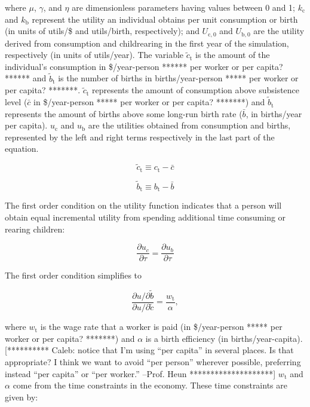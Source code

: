 \documentclass[letterpaper,12pt]{article}
\begin{document}
\noindent where $\mu$, $\gamma$, and $\eta$ are dimensionless parameters having values between 0 and 1; $k_\mathrm{c}$ and $k_\mathrm{b}$ represent the utility an individual obtains per unit consumption or birth (in units of utils/\$ and utils/birth, respectively); and $U_{\mathrm{c,0}}$ and $U_{\mathrm{b,0}}$ are the utility derived from consumption and childrearing in the first year of the simulation, respectively (in units of utils/year). The variable $\tilde c_\mathrm{t}$ is the amount of the individual's consumption in \$/year-person ****** per worker or per capita? ****** and $\tilde b_\mathrm{t}$ is the number of births in births/year-person ***** per worker or per capita? *******. $\tilde c_\mathrm{t}$ represents the amount of consumption above subsistence level ($\bar c$ in \$/year-person ***** per worker or per capita? *******) and $\tilde b_\mathrm{t}$ represents the amount of births above some long-run birth rate ($\bar b$, in births/year per capita). $u_\mathrm{c}$ and $u_\mathrm{b}$ are the utilities obtained from consumption and births, represented by the left and right terms respectively in the last part of the equation.

\begin{equation} \label{eq:c_tilde}
	\tilde c_\mathrm{t} \equiv c_\mathrm{t} - \bar c
\end{equation}

\begin{equation} \label{eq:b_tilde}
	\tilde b_\mathrm{t} \equiv b_\mathrm{t} - \bar b
\end{equation}

The first order condition on the utility function indicates that a person will obtain equal incremental utility from spending additional time consuming or rearing children:

\begin{equation} \label{eq:first_order_condition_def}
	\frac{\partial u_{c}}{\partial \tau} = \frac{\partial u_{b}}{\partial \tau}
\end{equation}

\noindent The first order condition simplifies to 

\begin{equation} \label{eq:first_order_condition_simplified}
	\frac{\partial u/ \partial\tilde b}{\partial u/ \partial\tilde c} = \frac{w_\mathrm{t}}{\alpha},
\end{equation}

\noindent where $w_\mathrm{t}$ is the wage rate that a worker is paid (in \$/year-person ***** per worker or per capita? *******) and $\alpha$ is a birth efficiency (in births/year-capita). [********** Caleb: notice that I'm using ``per capita'' in several places. Is that appropriate? I think we want to avoid ``per person'' wherever possible, preferring instead ``per capita'' or ``per worker.'' --Prof. Heun ********************] $w_\mathrm{t}$ and $\alpha$ come from the time constraints in the economy. These time constraints are given by:
\end{document}
